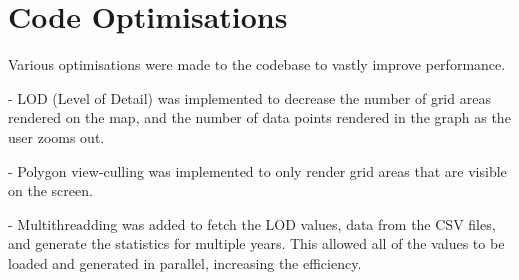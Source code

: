\section{Code Optimisations}
Various optimisations were made to the codebase to vastly improve performance.

    - LOD (Level of Detail) was implemented to decrease the number of grid areas rendered on the map, and the number of data points rendered in the graph as the user zooms out. 
    
    - Polygon view-culling was implemented to only render grid areas that are visible on the screen.
    
    - Multithreadding was added to fetch the LOD values, data from the CSV files, and generate the statistics for multiple years. This allowed all of the values to be loaded and generated in parallel, increasing the efficiency.